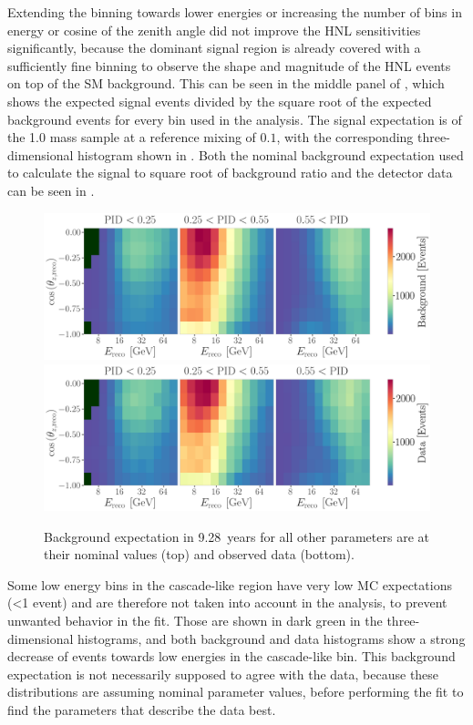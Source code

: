 Extending the binning towards lower energies or increasing the number of bins in energy or cosine of the zenith angle did not improve the HNL sensitivities significantly, because the dominant signal region is already covered with a sufficiently fine binning to observe the shape and magnitude of the HNL events on top of the SM background. This can be seen in the middle panel of , which shows the expected signal events divided by the square root of the expected background events for every bin used in the analysis. The signal expectation is of the \SI{1.0}{\gev} mass sample at a reference mixing of $0.1$, with the corresponding three-dimensional histogram shown in . Both the nominal background expectation used to calculate the signal to square root of background ratio and the detector data can be seen in .

\begin{figure}[h]
    \includegraphics{figures/results/3d_histograms/all_background.png}
    \includegraphics{figures/results/3d_histograms/all_data.png}
    \caption[Three-dimensional background expectation and observed data]{Background expectation in \SI{9.28}{years} for all other parameters are at their nominal values (top) and observed data (bottom).}
\end{figure}

Some low energy bins in the cascade-like region have very low MC expectations (<1 event) and are therefore not taken into account in the analysis, to prevent unwanted behavior in the fit. Those are shown in dark green in the three-dimensional histograms, and both background and data histograms show a strong decrease of events towards low energies in the cascade-like bin. This background expectation is not necessarily supposed to agree with the data, because these distributions are assuming nominal parameter values, before performing the fit to find the parameters that describe the data best.


